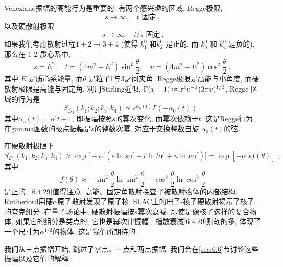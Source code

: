 Veneziano振幅的高能行为是重要的. 有两个感兴趣的区域, Regge极限,
\begin{equation}
	s \rightarrow \infty, \quad t \text{ 固定} \:, \label{6.4.25}
\end{equation}
以及硬散射极限
\begin{equation}
	s \rightarrow \infty, \quad t / s \text{ 固定} \:. \label{6.4.26}
\end{equation}
如果我们考虑散射过程$1+2 \rightarrow 3+4$ (使得 $k_{1}^{0}$ 和$k_{2}^{0}$ 是正的, 而 $k_{3}^{0}$ 和 $k_{4}^{0}$ 是负的), 
那么在 $1$-$2$ 质心系中,
\begin{equation}
	s=E^{2}, \quad t=(4 m^{2}-E^{2}) \sin^{2}\frac{\theta}{2}, \quad u=(4 m^{2}-E^{2}) \cos ^{2} \frac{\theta}{2} \:, \label{6.4.27}
\end{equation}
其中 $E$ 是质心系能量, 而$\theta$ 是粒子1与3之间夹角. Regge极限是高能与小角度, 而硬散射极限是高能与固定角. 利用Stirling近似, 
$\Gamma(x+1) \approx x^{x} \mathrm{e}^{-x}(2 \pi x)^{1 / 2}$, Regge 区域的行为是
\begin{equation}
	S_{D_{2}}(k_{1} ; k_{2} ; k_{3} ; k_{4}) \propto s^{\alpha_{\mathrm{o}}(t)} \Gamma(-\alpha_{0}(t)) \:, \label{6.4.28}
\end{equation}
其中$\alpha_{\mathrm{o}}(t)=\alpha^{\prime} t+1 $, 即振幅按照$s$的幂次变化, 而幂次依赖于$t$. 这是Regge行为. 
在gamma函数的极点振幅是$s$的整数次幂, 对应于交换整数自旋 $\alpha_{o}(t)$的弦.

在硬散射极限下
\begin{equation}
	S_{D_{2}}(k_{1} ; k_{2} ; k_{3} ; k_{4}) \approx \exp \bigl[-\alpha^{\prime}(s \ln s \alpha^{\prime}+t \ln t \alpha^{\prime}+u \ln u \alpha^{\prime})\bigr]=\exp [-\alpha^{\prime} s f(\theta)] \:, \label{6.4.29}
\end{equation}
其中
\begin{equation}
	f(\theta) \approx-\sin ^{2} \frac{\theta}{2} \ln \sin ^{2} \frac{\theta}{2}-\cos ^{2} \frac{\theta}{2} \ln \cos ^{2} \frac{\theta}{2}
	\label{6.4.30}
\end{equation}
是正的.  \eqref{6.4.29}值得注意. 高能、固定角散射探查了被散射物体的内部结构. Rutherford用硬$\alpha$原子散射发现了原子核.  
SLAC上的电子-核子硬散射揭示了核子的夸克组分. 在量子场论中, 硬散射振幅按$s $幂次衰减. 即使是像核子这样的复合物体, 如果它的组分是类点的, 它也是幂次律振幅 . 
指数衰减\eqref{6.4.29}则软的多, 体现了一个尺寸为$\alpha^{1 / 2}$的物体, 这是我们所期待的. 

我们从三点振幅开始, 跳过了零点、一点和两点振幅. 我们会在\ref{sec:6.6}节讨论这些振幅以及它们的解释 .

